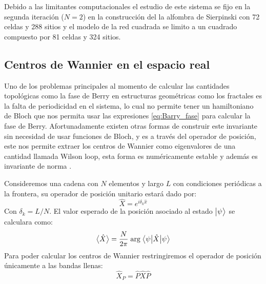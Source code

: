 Debido a las limitantes computacionales el estudio de este sistema se fijo en la segunda  iteración ($N=2$) en la construcción del la alfombra de Sierpinski con 72 celdas y 288 sitios y el modelo de la red cuadrada se limito a un cuadrado compuesto por 81 celdas y 324 sitios. 

\subsection{Centros de Wannier en el espacio real}

Uno de los problemas principales al momento de calcular las cantidades topológicas como la fase de Berry en estructuras geométricas como los fractales es la falta de periodicidad en el sistema, lo cual no permite tener un hamiltoniano de Bloch que nos permita usar las expresiones \ref{eq:Barry_fase} para calcular la fase de Berry. Afortunadamente existen otras formas de construir este invariante sin necesidad de usar funciones de Bloch, y es a través del operador de posición, este nos permite extraer los centros de Wannier como eigenvalores de una cantidad llamada Wilson loop, esta forma es numéricamente estable y además es invariante de norma \cite{Asboth2015}.

Consideremos una cadena con $N$ elementos y largo $L$ con condiciones periódicas a la frontera, su operador de posición unitario estará dado por:
\begin{equation}
    \hat{X} = e^{i\delta_k \hat{x}}
\end{equation}
Con $\delta_k = L/N$. El valor esperado de la posición asociado al estado $\big |{\psi}\big \rangle$ se calculara como:
\begin{equation}
    \big \langle{\hat{X}} \big \rangle = \frac{N}{2\pi} \; \text{arg} \; \big \langle{\psi}\big | {\hat{X}} \big | {\psi} \big \rangle
\end{equation}
Para poder calcular los centros de Wannier restringiremos el operador de posición únicamente a las bandas llenas:
\begin{equation}
    \hat{X}_P = \hat{P} \hat{X} \hat{P}
\end{equation}

